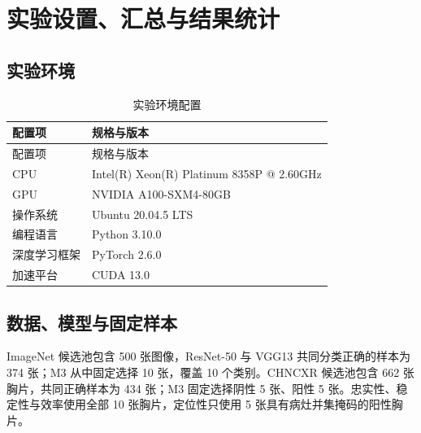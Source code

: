 \chapter{实验设置、汇总与结果统计}

\section{实验环境}

{\small
    \begin{xltabular}{\textwidth}{>{\raggedright\arraybackslash}p{4.0cm}X}
        \caption{实验环境配置}\label{tab:env-config} \\
        \toprule
        配置项 & 规格与版本 \\
        \midrule
        \endfirsthead
        \toprule
        配置项 & 规格与版本 \\
        \midrule
        \endhead
        CPU & Intel(R) Xeon(R) Platinum 8358P @ 2.60GHz \\
        GPU & NVIDIA A100-SXM4-80GB \\
        操作系统 & Ubuntu 20.04.5 LTS \\
        编程语言 & Python 3.10.0 \\
        深度学习框架 & PyTorch 2.6.0 \\
        加速平台 & CUDA 13.0 \\
        \bottomrule
    \end{xltabular}
}

\section{数据、模型与固定样本}

ImageNet 候选池包含 500 张图像，ResNet-50 与 VGG13 共同分类正确的样本为 374 张；M3 从中固定选择 10 张，覆盖 10 个类别。CHNCXR\cite{jaeger2014chncxr} 候选池包含 662 张胸片，共同正确样本为 434 张；M3 固定选择阴性 5 张、阳性 5 张。忠实性、稳定性与效率使用全部 10 张胸片，定位性只使用 5 张具有病灶并集掩码的阳性胸片。

